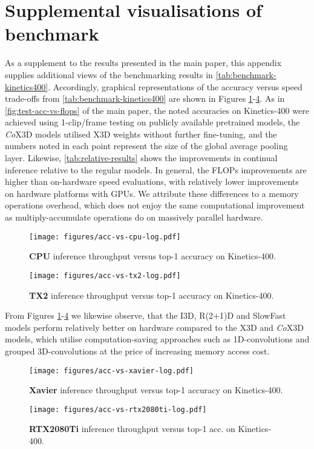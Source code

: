 \documentclass[runningheads]{llncs}
\begin{document}
\section{Supplemental visualisations of benchmark}
As a supplement to the results presented in the main paper, this appendix supplies additional views of the benchmarking results in \cref{tab:benchmark-kinetics400}.
Accordingly, graphical representations of the accuracy versus speed trade-offs from \cref{tab:benchmark-kinetics400} are shown in Figures \ref{fig:acc-vs-speed-cpu}-\ref{fig:acc-vs-speed-rtx}.
As in \cref{fig:test-acc-vs-flops} of the main paper, the noted accuracies on Kinetics-400 were achieved using 1-clip/frame testing on publicly available pretrained models, the \textit{Co}X3D models utilised X3D weights without further fine-tuning, and the numbers noted in each point represent the size of the global average pooling layer.
Likewise, \cref{tab:relative-results} shows the improvements in continual inference relative to the regular models.
In general, the FLOPs improvements are higher than on-hardware speed evaluations, with relatively lower improvements on hardware platforms with GPUs. 
We attribute these differences to a memory operations overhead, which does not enjoy the same computational improvement as multiply-accumulate operations do on massively parallel hardware.

\begin{figure}[b]
    \centering
    \texttt{[image: figures/acc-vs-cpu-log.pdf]}
\caption{\textbf{CPU} inference throughput versus top-1 accuracy on Kinetics-400. } 
    \label{fig:acc-vs-speed-cpu}
\end{figure}


\begin{figure}[b]
    \centering
    \texttt{[image: figures/acc-vs-tx2-log.pdf]}
\caption{\textbf{TX2} inference throughput versus top-1 accuracy on Kinetics-400. }
    \label{fig:acc-vs-speed-tx2}
\end{figure}






From Figures \ref{fig:acc-vs-speed-cpu}-\ref{fig:acc-vs-speed-rtx} we likewise observe, that the I3D, R(2+1)D and SlowFast models perform relatively better on hardware compared to the X3D and \textit{Co}X3D models, which utilise computation-saving approaches such as 1D-convolutions and grouped 3D-convolutions at the price of increasing memory access cost.


\begin{figure}[b]
    \centering
    \texttt{[image: figures/acc-vs-xavier-log.pdf]}
\caption{\textbf{Xavier} inference throughput versus top-1 accuracy on Kinetics-400.}
    \label{fig:acc-vs-speed-xavier}
\end{figure}

\begin{figure}[!b]
    \centering
    \texttt{[image: figures/acc-vs-rtx2080ti-log.pdf]}
\caption{\textbf{RTX2080Ti} inference throughput versus top-1 acc. on Kinetics-400.}
    \label{fig:acc-vs-speed-rtx}
\end{figure}

 
\end{document}
